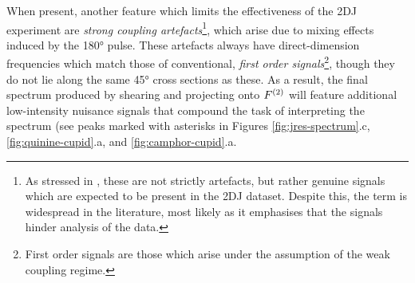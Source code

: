 When present, another feature which limits the effectiveness of the \ac{2DJ}
experiment are \emph{strong coupling artefacts}\footnote{
    As stressed in \cite{Thrippleton2005}, these are not strictly artefacts,
    but rather genuine signals which are expected to be present in the
    \ac{2DJ} dataset. Despite this, the term is widespread in the literature,
    most likely as it emphasises that the signals hinder analysis of the data.
}, which arise due to mixing effects induced by the \ang{180}
pulse\cite{Wider1983,Thrippleton2005}.
These artefacts always have direct-dimension
frequencies which match those of conventional, \emph{first order signals}\footnote{
    First order signals are those which arise under the assumption of the weak
    coupling regime\cite[Section 2.5.2]{Cavanagh2007}.
}, though they do not lie along the same \ang{45} cross sections as
these. As a result, the final spectrum produced by shearing and projecting onto
$F^{(2)}$ will feature additional low-intensity nuisance signals that
compound the task of interpreting the spectrum (see peaks marked with asterisks
in Figures \ref{fig:jres-spectrum}.c, \ref{fig:quinine-cupid}.a, and
\ref{fig:camphor-cupid}.a.

